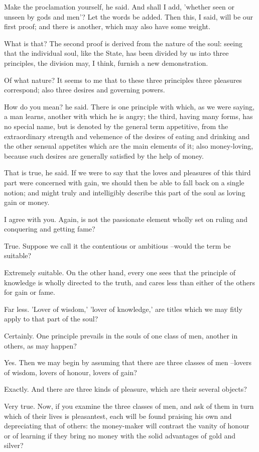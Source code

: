 Make the proclamation yourself, he said.
And shall I add, 'whether seen or unseen by gods and men'?
Let the words be added.
Then this, I said, will be our first proof; and there is another, which may also have some weight.

What is that?
The second proof is derived from the nature of the soul: seeing that the individual soul, like the State, has been divided by us into three principles, the division may, I think, furnish a new demonstration.

Of what nature?
It seems to me that to these three principles three pleasures correspond; also three desires and governing powers.

How do you mean? he said.
There is one principle with which, as we were saying, a man learns, another with which he is angry; the third, having many forms, has no special name, but is denoted by the general term appetitive, from the extraordinary strength and vehemence of the desires of eating and drinking and the other sensual appetites which are the main elements of it; also money-loving, because such desires are generally satisfied by the help of money.

That is true, he said.
If we were to say that the loves and pleasures of this third part were concerned with gain, we should then be able to fall back on a single notion; and might truly and intelligibly describe this part of the soul as loving gain or money.

I agree with you.
Again, is not the passionate element wholly set on ruling and conquering and getting fame?

True.
Suppose we call it the contentious or ambitious --would the term be suitable?

Extremely suitable.
On the other hand, every one sees that the principle of knowledge is wholly directed to the truth, and cares less than either of the others for gain or fame.

Far less.
'Lover of wisdom,' 'lover of knowledge,' are titles which we may fitly apply to that part of the soul?

Certainly.
One principle prevails in the souls of one class of men, another in others, as may happen?

Yes.
Then we may begin by assuming that there are three classes of men --lovers of wisdom, lovers of honour, lovers of gain?

Exactly.
And there are three kinds of pleasure, which are their several objects?

Very true.
Now, if you examine the three classes of men, and ask of them in turn which of their lives is pleasantest, each will be found praising his own and depreciating that of others: the money-maker will contrast the vanity of honour or of learning if they bring no money with the solid advantages of gold and silver?

